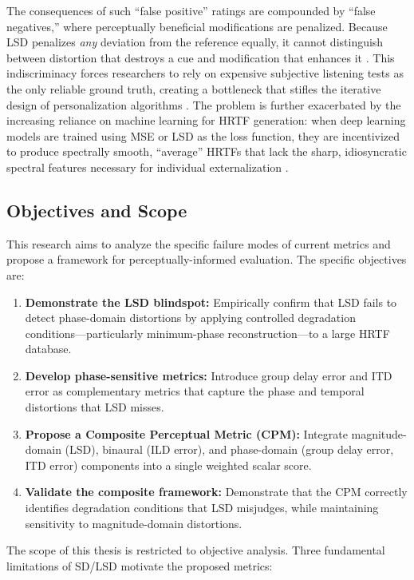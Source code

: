 \documentclass[12pt,a4paper]{article}
\begin{document}
The consequences of such ``false positive'' ratings are compounded by ``false negatives,'' where perceptually beneficial modifications are penalized. Because LSD penalizes \textit{any} deviation from the reference equally, it cannot distinguish between distortion that destroys a cue and modification that enhances it \cite{audloc2024}. This indiscriminacy forces researchers to rely on expensive subjective listening tests as the only reliable ground truth, creating a bottleneck that stifles the iterative design of personalization algorithms \cite{zhang2025}. The problem is further exacerbated by the increasing reliance on machine learning for HRTF generation: when deep learning models are trained using MSE or LSD as the loss function, they are incentivized to produce spectrally smooth, ``average'' HRTFs that lack the sharp, idiosyncratic spectral features necessary for individual externalization \cite{itd_loss2024}.


\subsection{Objectives and Scope}

This research aims to analyze the specific failure modes of current metrics and propose a framework for perceptually-informed evaluation. The specific objectives are:

\begin{enumerate}
  \item \textbf{Demonstrate the LSD blindspot:} Empirically confirm that LSD fails to detect phase-domain distortions by applying controlled degradation conditions---particularly minimum-phase reconstruction---to a large HRTF database.
  \item \textbf{Develop phase-sensitive metrics:} Introduce group delay error and ITD error as complementary metrics that capture the phase and temporal distortions that LSD misses.
  \item \textbf{Propose a Composite Perceptual Metric (CPM):} Integrate magnitude-domain (LSD), binaural (ILD error), and phase-domain (group delay error, ITD error) components into a single weighted scalar score.
  \item \textbf{Validate the composite framework:} Demonstrate that the CPM correctly identifies degradation conditions that LSD misjudges, while maintaining sensitivity to magnitude-domain distortions.
\end{enumerate}

The scope of this thesis is restricted to objective analysis. Three fundamental limitations of SD/LSD motivate the proposed metrics:
\end{document}
